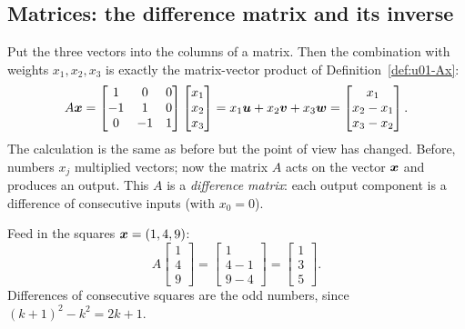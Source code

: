 \subsection{Matrices: the difference matrix and its inverse}

Put the three vectors into the columns of a matrix. Then the combination with weights
$x_1,x_2,x_3$ is exactly the matrix-vector product of Definition~\ref{def:u01-Ax}:
\begin{equation}\label{eq:u02-A}
  A\boldsymbol{x}=\begin{bmatrix} 1 & 0 & 0\\ -1 & 1 & 0\\ 0 & -1 & 1\end{bmatrix}
  \begin{bmatrix} x_1\\ x_2\\ x_3\end{bmatrix}
  = x_1\boldsymbol{u}+x_2\boldsymbol{v}+x_3\boldsymbol{w}
  = \begin{bmatrix} x_1\\ x_2-x_1\\ x_3-x_2\end{bmatrix}.
\end{equation}
The calculation is the same as before but the point of view has changed. Before, numbers
$x_j$ multiplied vectors; now the matrix $A$ acts on the vector $\boldsymbol{x}$ and produces an
output. This $A$ is a \emph{difference matrix}: each output component is a difference of
consecutive inputs (with $x_0=0$).

\begin{example}\label{ex:u02-squares}
Feed in the squares $\boldsymbol{x}=(1,4,9)$:
\[
  A\begin{bmatrix} 1\\ 4\\ 9\end{bmatrix}
  =\begin{bmatrix} 1\\ 4-1\\ 9-4\end{bmatrix}=\begin{bmatrix} 1\\ 3\\ 5\end{bmatrix}.
\]
Differences of consecutive squares are the odd numbers, since $(k+1)^2-k^2=2k+1$.
\end{example}

